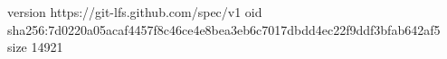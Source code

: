 version https://git-lfs.github.com/spec/v1
oid sha256:7d0220a05acaf4457f8c46ce4e8bea3eb6c7017dbdd4ec22f9ddf3bfab642af5
size 14921
